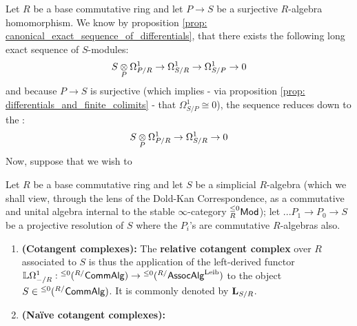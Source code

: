                 Let $R$ be a base commutative ring and let $P \to S$ be a surjective $R$-algebra homomorphism. We know by proposition \ref{prop: canonical_exact_sequence_of_differentials}, that there exists the following long exact sequence of $S$-modules:
                    $$S \tensor_P \Omega^1_{P/R} \to \Omega^1_{S/R} \to \Omega^1_{S/P} \to 0$$
                and because $P \to S$ is surjective (which implies - via proposition \ref{prop: differentials_and_finite_colimits} - that $\Omega^1_{S/P} \cong 0$), the sequence reduces down to the :
                    $$S \tensor_P \Omega^1_{P/R} \to \Omega^1_{S/R} \to 0$$
                Now, suppose that we wish to 
            
                \begin{definition} \label{def: cotangent_complexes}  
                    Let $R$ be a base commutative ring and let $S$ be a simplicial $R$-algebra (which we shall view, through the lens of the Dold-Kan Correspondence, as a commutative and unital algebra internal to the stable $\infty$-category ${}_R^{\leq 0}\mathsf{Mod}$); let $... P_1 \to P_0 \to S$ be a projective resolution of $S$ where the $P_i$'s are commutative $R$-algebras also. 
                    \begin{enumerate}
                        \item \textbf{(Cotangent complexes):} The \textbf{relative cotangent complex} over $R$ associated to $S$ is thus the application of the left-derived functor $\mathbb{L}\Omega^1_{-/R}: {}^{\leq 0}({}^{R/}\mathsf{Comm}\mathsf{Alg}) \to {}^{\leq 0}({}^{R/}\mathsf{Assoc}\mathsf{Alg}^{\mathrm{Leib}})$ to the object $S \in {}^{\leq 0}({}^{R/}\mathsf{Comm}\mathsf{Alg})$. It is commonly denoted by $\mathbf{L}_{S/R}$.
                        \item \textbf{(Na\"ive cotangent complexes):}
                    \end{enumerate}
                \end{definition}

